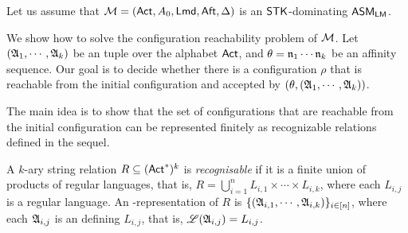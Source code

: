 


Let us assume that ${\mathcal{M} }=({\sf Act},A_0,{\sf Lmd},{\sf Aft},\Delta)$ is an ${\sf STK}$-dominating $\textsf{ASM}_\textsf{LM}$.

We show how to solve the configuration reachability problem of ${\mathcal{M} }$.  
Let $({\mathfrak{A} }_1,\cdots,{\mathfrak{A} }_k)$ be an {\NFA} tuple over the alphabet ${\sf Act}$, and $\theta = \mathfrak{n}_1\cdots\mathfrak{n}_k$ be an affinity sequence. 
Our goal is to decide whether there is a configuration $\rho$ that is reachable from the initial configuration and accepted by $(\theta, ({\mathfrak{A} }_1,\cdots,{\mathfrak{A} }_k))$.

The main idea is to show that the set of configurations that are reachable from the initial configuration can be represented finitely as recognizable relations defined in the sequel. 

\begin{definition}
A $k$-ary string relation $R \subseteq ({\sf Act}^*)^k$ is \emph{recognisable}  if it is a finite union of products of regular languages, that is, $R=\bigcup \limits_{i =1 }^n L_{i,1} \times \cdots \times L_{i, k}$, where each $L_{i,j}$ is a regular language. An {\NFA}-representation of $R$ is $\{({\mathfrak{A} }_{i,1},\cdots,{\mathfrak{A} }_{i,k})\}_{i\in[n]}$, where each ${\mathfrak{A} }_{i,j}$ is an {\NFA} defining $L_{i,j}$, that is, ${\mathscr{L} }({\mathfrak{A} }_{i,j}) = L_{i,j}$.
\end{definition}

